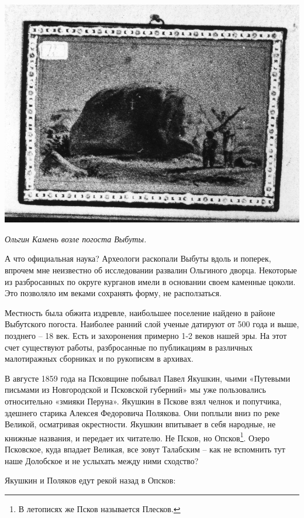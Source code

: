 \begin{center}
\includegraphics[width=0.90\linewidth]{chast-volga/vybuty/vyb-olgin-kamen-02.jpg}

\textit{Ольгин Камень возле погоста Выбуты.}
\end{center}

\newpage

А что официальная наука? Археологи раскопали Выбуты вдоль и поперек, впрочем мне неизвестно об исследовании развалин Ольгиного дворца. Некоторые из разбросанных по округе курганов имели в основании своем каменные цоколи. Это позволяло им веками сохранять форму, не расползаться.

Местность была обжита издревле, наибольшее поселение найдено в районе Выбутского погоста. Наиболее ранний слой ученые датируют от 500 года и выше, позднего – 18 век. Есть и захоронения примерно 1-2 веков нашей эры. На этот счет существуют работы, разбросанные по публикациям в различных малотиражных сборниках и по рукописям в архивах.

В августе 1859 года на Псковщине побывал Павел Якушкин, чьими «Путевыми письмами из Новгородской и Псковской губерний»\cite{yakushin01} мы уже пользовались относительно «змияки Перуна». Якушкин в Пскове взял челнок и попутчика, здешнего старика Алексея Федоровича Полякова. Они поплыли вниз по реке Великой, осматривая окрестности. Якушкин впитывает в себя народные, не книжные названия, и передает их читателю. Не Псков, но Опсков\footnote{В летописях же Псков называется Плесков.}. Озеро Псковское, куда впадает Великая, все зовут Талабским – как не вспомнить тут наше Долобское и не услыхать между ними сходство?

Якушкин и Поляков едут рекой назад в Опсков:

